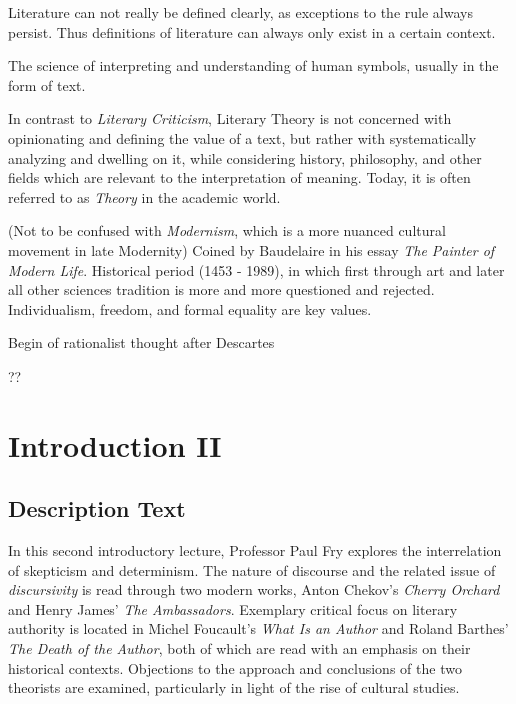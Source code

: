 \documentclass[]{scrartcl}
\begin{document}
\begin{description}[leftmargin=!,labelwidth=\widthof{\bfseries Cartesian Revolution}]
  \item[Literature] Literature can not really be defined clearly, as exceptions to the rule always persist. Thus definitions of literature can always only exist in a certain context.
  \item[Hermeneutics] The science of interpreting and understanding of human symbols, usually in the form of text.
  \item[Literary Theory] In contrast to \emph{Literary Criticism}, Literary Theory is not concerned with opinionating and defining the value of a text, but rather with systematically analyzing and dwelling on it, while considering history, philosophy, and other fields which are relevant to the interpretation of meaning. Today, it is often referred to as \emph{Theory} in the academic world.
  \item[Modernity] (Not to be confused with \emph{Modernism}, which is a more nuanced cultural movement in late Modernity) Coined by Baudelaire in his essay \emph{The Painter of Modern Life}. Historical period (1453 - 1989), in which first through art and later all other sciences tradition is more and more questioned and rejected. Individualism, freedom, and formal equality are key values.
  \item[Cartesian Revolution] Begin of rationalist thought after Descartes
  \item[Verfremdung] ??
\end{description}

\section{Introduction II}

\subsection{Description Text}

\vspace{15pt}

In this second introductory lecture, Professor Paul Fry explores the interrelation of skepticism and determinism. The nature of discourse and the related issue of \emph{discursivity} is read through two modern works, Anton Chekov's \emph{Cherry Orchard} and Henry James' \emph{The Ambassadors}. Exemplary critical focus on literary authority is located in Michel Foucault's \emph{What Is an Author} and Roland Barthes' \emph{The Death of the Author}, both of which are read with an emphasis on their historical contexts. Objections to the approach and conclusions of the two theorists are examined, particularly in light of the rise of cultural studies.
\end{document}
